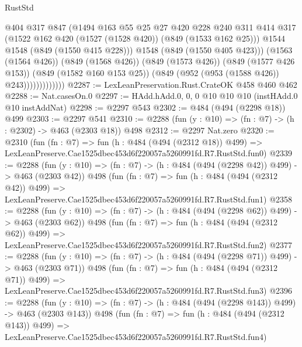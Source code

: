 \begin{lexlean}{RustStd}
\begin{coremodule}
                            @404
                            @317
                            @847
                            (@1494
                              @163
                              @55
                              @25
                              @27
                              @420
                              @228
                              @240
                              @311
                              @414
                              @317
                              (@1522 @162 @420 (@1527 (@1528 @420)) (@849 (@1533 @162 @25)))
                              @1544
                              @1548
                              (@849 (@1550 @415 @228)))
                            @1548
                            (@849 (@1550 @405 @423)))
                          (@1563 (@1564 @426))
                          (@849 (@1568 @426))
                          (@849 (@1573 @426))
                          (@849 (@1577 @426 @153))
                          (@849 (@1582 @160 @153 @25))
                          (@849 (@952 (@953 (@1588 @426)) @243)))))))))))))
@2287 := LexLeanPreservation.Rust.CrateOK @458 @460 @462
@2288 := Nat.casesOn.{0}
@2297 := HAdd.hAdd.{0, 0, 0} @10 @10 @10 (instHAdd.{0} @10 instAddNat)
@2298 := @2297 @543
@2302 := @484 (@494 (@2298 @18)) @499
@2303 := @2297 @541
@2310 := @2288 (fun (y : @10) => (fn : @7) -> (h : @2302) -> @463 (@2303 @18)) @498
@2312 := @2297 Nat.zero
@2320 := @2310
    (fun (fn : @7) =>
    fun (h : @484 (@494 (@2312 @18)) @499) =>
    LexLeanPreserve.Cae1525dbec453d6f220057a5260991fd.R7.RustStd.fun0)
@2339 := @2288
    (fun (y : @10) => (fn : @7) -> (h : @484 (@494 (@2298 @42)) @499) -> @463 (@2303 @42))
    @498
    (fun (fn : @7) =>
    fun (h : @484 (@494 (@2312 @42)) @499) =>
    LexLeanPreserve.Cae1525dbec453d6f220057a5260991fd.R7.RustStd.fun1)
@2358 := @2288
    (fun (y : @10) => (fn : @7) -> (h : @484 (@494 (@2298 @62)) @499) -> @463 (@2303 @62))
    @498
    (fun (fn : @7) =>
    fun (h : @484 (@494 (@2312 @62)) @499) =>
    LexLeanPreserve.Cae1525dbec453d6f220057a5260991fd.R7.RustStd.fun2)
@2377 := @2288
    (fun (y : @10) => (fn : @7) -> (h : @484 (@494 (@2298 @71)) @499) -> @463 (@2303 @71))
    @498
    (fun (fn : @7) =>
    fun (h : @484 (@494 (@2312 @71)) @499) =>
    LexLeanPreserve.Cae1525dbec453d6f220057a5260991fd.R7.RustStd.fun3)
@2396 := @2288
    (fun (y : @10) => (fn : @7) -> (h : @484 (@494 (@2298 @143)) @499) -> @463 (@2303 @143))
    @498
    (fun (fn : @7) =>
    fun (h : @484 (@494 (@2312 @143)) @499) =>
    LexLeanPreserve.Cae1525dbec453d6f220057a5260991fd.R7.RustStd.fun4)

\end{coremodule}
\end{lexlean}
